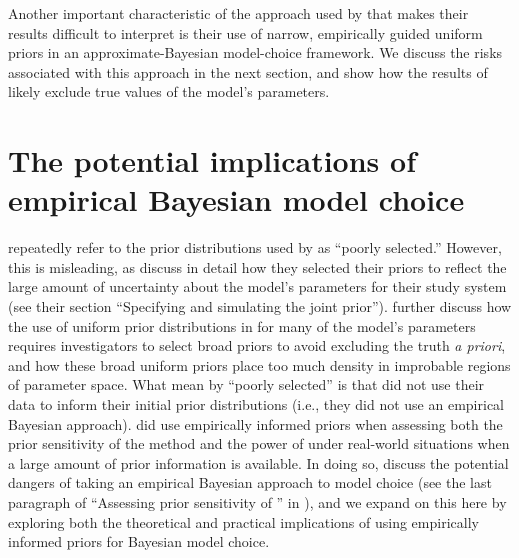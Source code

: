 


Another important characteristic of the approach used by \citet{Hickerson2013}
that makes their results difficult to interpret is their use of narrow,
empirically guided uniform priors in an approximate-Bayesian model-choice
framework.
We discuss the risks associated with this approach in the next section, and
show how the results of \citet{Hickerson2013} likely exclude true values of the
model's parameters.



\section*{The potential implications of empirical Bayesian model choice}
\citet{Hickerson2013} repeatedly refer to the prior distributions used by
\citet{Oaks2012} as ``poorly selected.''
However, this is misleading, as \citet{Oaks2012} discuss in detail how they
selected their priors to reflect the large amount of uncertainty about the
model's parameters for their study system (see their section ``Specifying and
simulating the joint prior'').
\citet{Oaks2012} further discuss how the use of uniform prior distributions in
\msb for many of the model's parameters requires investigators to select broad
priors to avoid excluding the truth \textit{a priori}, and how these broad
uniform priors place too much density in improbable regions of parameter space.
What \citet{Hickerson2013} mean by ``poorly selected'' is that
\citet{Oaks2012} did not use their data to inform their initial prior
distributions (i.e., they did not use an empirical Bayesian approach).
\citet{Oaks2012} did use empirically informed priors when assessing both the
prior sensitivity of the method and the power of \msb under real-world
situations when a large amount of prior information is available. 
In doing so, \citet{Oaks2012} discuss
the potential dangers of taking an empirical Bayesian approach to model choice
(see the last paragraph of ``Assessing prior sensitivity of \msb'' in
\citet{Oaks2012}), and we expand on this here by exploring both the theoretical
and practical implications of using empirically informed priors for Bayesian
model choice.

